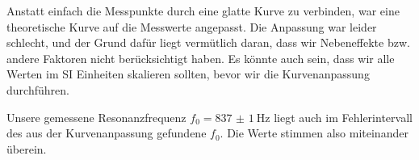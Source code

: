 	Anstatt einfach die Messpunkte durch eine glatte Kurve zu verbinden, war eine theoretische Kurve auf die Messwerte angepasst. Die Anpassung war leider schlecht, und der Grund dafür liegt vermütlich daran, dass wir Nebeneffekte bzw. andere Faktoren nicht berücksichtigt haben. Es könnte auch sein, dass wir alle Werten im SI Einheiten skalieren sollten, bevor wir die Kurvenanpassung durchführen. 

	Unsere gemessene Resonanzfrequenz $f_0 = \SI{837(1)}{\hertz}$ liegt auch im Fehlerintervall des aus der Kurvenanpassung gefundene $f_0$. Die Werte stimmen also miteinander überein.
